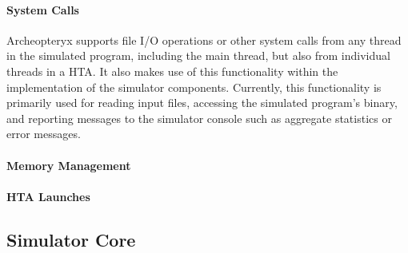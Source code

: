 \documentclass[conference, 10pt]{IEEEtran}
\begin{document}
\paragraph{System Calls}
Archeopteryx supports file I/O operations or other system calls from any thread
in the simulated program, including the main thread, but also from individual
threads in a HTA.  It also makes use of this functionality within the
implementation of the simulator components. Currently, this functionality is
primarily used for reading input files, accessing the simulated program's
binary, and reporting messages to the simulator console such as aggregate
statistics or error messages. 

\paragraph{Memory Management}

\paragraph{HTA Launches}

\subsection{Simulator Core}





\end{document}

